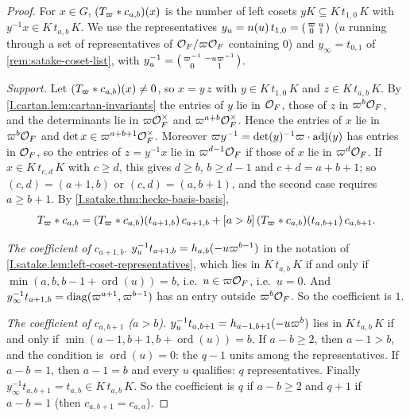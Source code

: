 \begin{theorem}
\end{theorem}
\begin{proof}
For $x\in G$, $(T_\varpi*c_{a,b})(x)$ is the number of left cosets $yK\subseteq K\,t_{1,0}\,K$ with
$y^{-1}x\in K\,t_{a,b}\,K$. We use the representatives $y_u=n(u)\,t_{1,0}=\begin{psmallmatrix}\varpi&u\\0&1\end{psmallmatrix}$
($u$ running through a set of representatives of $\mathcal{O}_F/\varpi\mathcal{O}_F$ containing $0$) and $y_\infty=t_{0,1}$ of
\cref{rem:satake-coset-list}, with $y_u^{-1}=\begin{psmallmatrix}\varpi^{-1}&-u\varpi^{-1}\\0&1\end{psmallmatrix}$.

\emph{Support.} Let $(T_\varpi*c_{a,b})(x)\neq0$, so $x=y\,z$ with $y\in K\,t_{1,0}\,K$ and $z\in K\,t_{a,b}\,K$. By
\cref{I.cartan.lem:cartan-invariants} the entries of $y$ lie in $\mathcal{O}_F$, those of $z$ in $\varpi^b\mathcal{O}_F$, and the
determinants lie in $\varpi\mathcal{O}_F^\times$ and $\varpi^{a+b}\mathcal{O}_F^\times$. Hence the entries of $x$ lie in
$\varpi^b\mathcal{O}_F$ and $\det x\in\varpi^{a+b+1}\mathcal{O}_F^\times$. Moreover $\varpi y^{-1}=\det(y)^{-1}\varpi\cdot\operatorname{adj}(y)$
has entries in $\mathcal{O}_F$, so the entries of $z=y^{-1}x$ lie in $\varpi^{d-1}\mathcal{O}_F$ if those of $x$ lie in
$\varpi^d\mathcal{O}_F$. If $x\in K\,t_{c,d}\,K$ with $c\ge d$, this gives $d\ge b$, $b\ge d-1$ and $c+d=a+b+1$; so
$(c,d)=(a+1,b)$ or $(c,d)=(a,b+1)$, and the second case requires $a\ge b+1$. By
\cref{I.satake.thm:hecke-basis-basis},
\[
  T_\varpi*c_{a,b}=(T_\varpi*c_{a,b})(t_{a+1,b})\,c_{a+1,b}+[a>b]\,(T_\varpi*c_{a,b})(t_{a,b+1})\,c_{a,b+1}.
\]

\emph{The coefficient of $c_{a+1,b}$.} $y_u^{-1}t_{a+1,b}=h_{a,b}(-u\varpi^{b-1})$ in the notation of
\cref{I.satake.lem:left-coset-representatives}, which lies in $K\,t_{a,b}\,K$ if and only if
$\min(a,b,b-1+\operatorname{ord}(u))=b$, i.e.\ $u\in\varpi\mathcal{O}_F$, i.e.\ $u=0$. And
$y_\infty^{-1}t_{a+1,b}=\operatorname{diag}(\varpi^{a+1},\varpi^{b-1})$ has an entry outside $\varpi^b\mathcal{O}_F$. So the coefficient is $1$.

\emph{The coefficient of $c_{a,b+1}$ ($a>b$).} $y_u^{-1}t_{a,b+1}=h_{a-1,b+1}(-u\varpi^b)$ lies in $K\,t_{a,b}\,K$ if and
only if $\min(a-1,b+1,b+\operatorname{ord}(u))=b$. If $a-b\ge2$, then $a-1>b$, and the condition is
$\operatorname{ord}(u)=0$: the $q-1$ units among the representatives. If $a-b=1$, then $a-1=b$ and every $u$ qualifies:
$q$ representatives. Finally $y_\infty^{-1}t_{a,b+1}=t_{a,b}\in K\,t_{a,b}\,K$. So the coefficient is $q$ if $a-b\ge2$ and
$q+1$ if $a-b=1$ (then $c_{a,b+1}=c_{a,a}$).
\end{proof}

